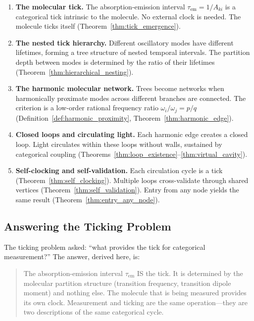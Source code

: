 \documentclass[11pt,twocolumn,a4paper]{article}
\theoremstyle{definition}
\theoremstyle{remark}
\newcommand{\tem}{\tau_{\mathrm{em}}}
\newcommand{\Aki}{A_{ki}}
\begin{document}
\begin{enumerate}
\item \textbf{The molecular tick.} The absorption-emission interval $\tem = 1/\Aki$ is a categorical tick intrinsic to the molecule. No external clock is needed. The molecule ticks itself (Theorem~\ref{thm:tick_emergence}).

\item \textbf{The nested tick hierarchy.} Different oscillatory modes have different lifetimes, forming a tree structure of nested temporal intervals. The partition depth between modes is determined by the ratio of their lifetimes (Theorem~\ref{thm:hierarchical_nesting}).

\item \textbf{The harmonic molecular network.} Trees become networks when harmonically proximate modes across different branches are connected. The criterion is a low-order rational frequency ratio $\omega_i/\omega_j = p/q$ (Definition~\ref{def:harmonic_proximity}, Theorem~\ref{thm:harmonic_edge}).

\item \textbf{Closed loops and circulating light.} Each harmonic edge creates a closed loop. Light circulates within these loops without walls, sustained by categorical coupling (Theorems~\ref{thm:loop_existence}--\ref{thm:virtual_cavity}).

\item \textbf{Self-clocking and self-validation.} Each circulation cycle is a tick (Theorem~\ref{thm:self_clocking}). Multiple loops cross-validate through shared vertices (Theorem~\ref{thm:self_validation}). Entry from any node yields the same result (Theorem~\ref{thm:entry_any_node}).
\end{enumerate}

\subsection{Answering the Ticking Problem}

The ticking problem asked: ``what provides the tick for categorical measurement?'' The answer, derived here, is:

\begin{quote}
The absorption-emission interval $\tem$ IS the tick. It is determined by the molecular partition structure (transition frequency, transition dipole moment) and nothing else. The molecule that is being measured provides its own clock. Measurement and ticking are the same operation---they are two descriptions of the same categorical cycle.
\end{quote}
\end{document}
